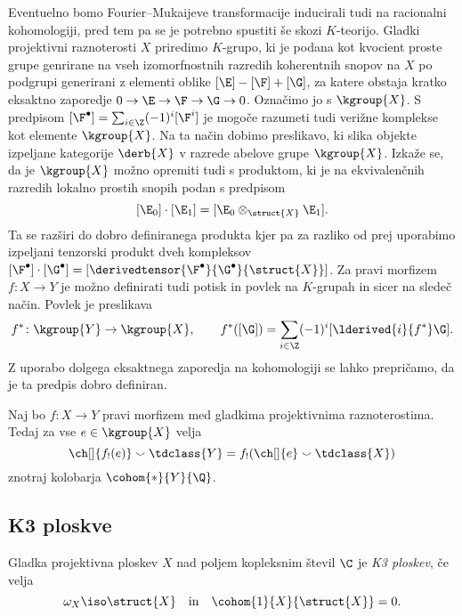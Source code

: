 Eventuelno bomo Fourier--Mukaijeve transformacije inducirali tudi na racionalni kohomologiji, pred tem pa se je potrebno spustiti še skozi $K$-teorijo. Gladki projektivni raznoterosti $X$ priredimo $K$-grupo, ki je podana kot kvocient proste grupe genrirane na vseh izomorfnostnih razredih koherentnih snopov na $X$ po podgrupi generirani z elementi oblike $[\E] - [\F] + [\G]$, za katere obstaja kratko eksaktno zaporedje $0 \to \E \to \F \to \G \to 0$. Označimo jo s $\kgroup{X}$. S predpisom $[\F^\bullet] = \sum_{i \in \Z} (-1)^i[\F^i]$ je mogoče razumeti tudi verižne komplekse kot elemente $\kgroup{X}$. Na ta način dobimo preslikavo, ki slika objekte izpeljane kategorije $\derb{X}$ v razrede abelove grupe $\kgroup{X}$. Izkaže se, da je $\kgroup{X}$ možno opremiti tudi s produktom, ki je na ekvivalenčnih razredih lokalno prostih snopih podan s predpisom 
\[
    [\E_0] \cdot [\E_1] = [\E_0 \otimes_{\struct{X}} \E_1].
\]
Ta se razširi do dobro definiranega produkta kjer pa za razliko od prej uporabimo izpeljani tenzorski produkt dveh kompleksov $[\F^\bullet]\cdot [\G^\bullet] = [\derivedtensor{\F^\bullet}{\G^\bullet}{\struct{X}}]$. Za pravi morfizem $f \colon X \to Y$ je možno definirati tudi potisk in povlek na $K$-grupah in sicer na sledeč način. 
Povlek je preslikava
\[
    f^* \colon \kgroup{Y} \to \kgroup{X}, \qquad f^*([\G]) = \sum_{i \in \Z}(-1)^i[\lderived{i}{f^*}\G].
\]
Z uporabo dolgega eksaktnega zaporedja na kohomologiji se lahko prepričamo, da je ta predpis dobro definiran.

\begin{izrek}
    \label{Grothendieck-Riemann-Roch}
    Naj bo $f \colon X \to Y$ pravi morfizem med gladkima projektivnima raznoterostima. Tedaj za vse $e \in \kgroup{X}$ velja
    \begin{equation}
        \ch[]{f_!(e)} \smallsmile \tdclass{Y} = f_!(\ch[]{e} \smallsmile \tdclass{X})
    \end{equation}
    znotraj kolobarja $\cohom{*}{Y}{\Q}$.
\end{izrek}

\subsection*{K3 ploskve}

\begin{definicija}
    Gladka projektivna ploskev $X$ nad poljem kopleksnim števil $\C$ je \emph{K3 ploskev}, če velja
    \[
        \omega_X \iso \struct{X} \quad \text{in} \quad \cohom{1}{X}{\struct{X}} = 0.
    \]
\end{definicija}

